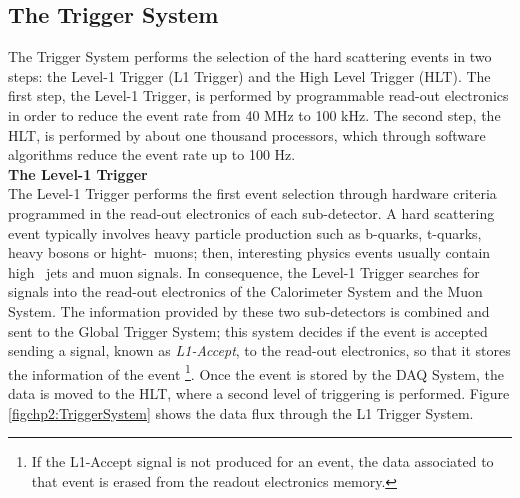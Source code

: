 

\subsection{The Trigger System}
\label{subsec:Trigger}

\noindent The Trigger System performs the selection of the hard scattering events in two steps:
the Level-1 Trigger (L1 Trigger) and the High Level Trigger (HLT). The first step, the Level-1 Trigger,
is performed by programmable read-out electronics in order to reduce the event rate from 40 MHz 
to 100 kHz. The second step, the HLT, is performed by about one thousand processors, which through
software algorithms reduce the event rate up to 100 Hz. \\

\textbf{The Level-1 Trigger}\\

\noindent The Level-1 Trigger performs the first event selection through hardware criteria programmed 
in the read-out electronics of each sub-detector. A hard scattering event typically 
involves heavy particle production such as b-quarks, t-quarks, heavy bosons 
or hight-\pt~muons; then, interesting physics events usually contain high \pt~jets and muon signals. In 
consequence, the Level-1 Trigger searches for signals into the read-out electronics 
of the Calorimeter System and the Muon System. The information provided by these two sub-detectors
is combined and sent to the Global Trigger System; this system decides
if the event is accepted sending a signal, known as \textit{L1-Accept}, to the read-out electronics, so that
it stores the information of the event \footnote[1]{If the L1-Accept signal is not produced for an event, the data associated to that event is 
erased from the readout electronics memory.}. Once the event is stored by the DAQ System, the data is moved 
to the HLT, where a second level of triggering is performed. Figure \ref{figchp2:TriggerSystem} shows 
the data flux through the L1 Trigger System. \\

